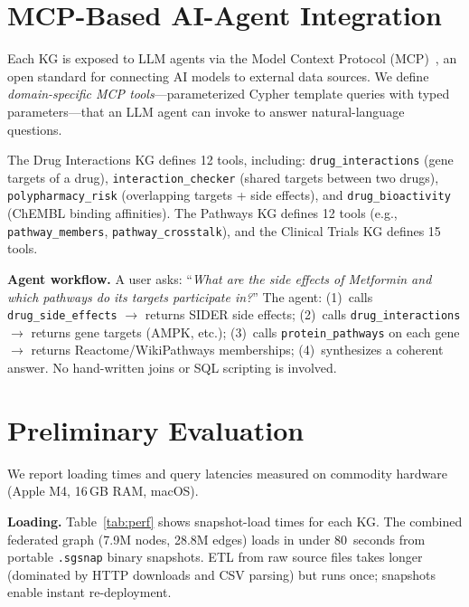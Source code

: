 \documentclass[sigconf]{acmart}
\begin{document}
\section{MCP-Based AI-Agent Integration}\label{sec:mcp}

Each KG is exposed to LLM agents via the Model Context
Protocol (MCP)~\cite{anthropic2024mcp}, an open standard for
connecting AI models to external data sources.  We define
\emph{domain-specific MCP tools}---parameterized Cypher template
queries with typed parameters---that an LLM agent can invoke
to answer natural-language questions.

The Drug Interactions KG defines 12 tools, including:
\texttt{drug\_interactions} (gene targets of a drug),
\texttt{interaction\_checker} (shared targets between two drugs),
\texttt{polypharmacy\_risk} (overlapping targets + side effects),
and \texttt{drug\_bioactivity} (ChEMBL binding affinities).
The Pathways KG defines 12 tools (e.g., \texttt{pathway\_members},
\texttt{pathway\_crosstalk}), and the Clinical Trials KG defines
15 tools.

\smallskip\noindent\textbf{Agent workflow.}  A user asks: ``\emph{What are
the side effects of Metformin and which pathways do its targets
participate in?}''  The agent: (1)~calls \texttt{drug\_side\_effects}
$\to$ returns SIDER side effects; (2)~calls
\texttt{drug\_interactions} $\to$ returns gene targets (AMPK, etc.);
(3)~calls \texttt{protein\_pathways} on each gene $\to$ returns
Reactome/WikiPathways memberships; (4)~synthesizes a coherent answer.
No hand-written joins or SQL scripting is involved.

\section{Preliminary Evaluation}\label{sec:eval}

We report loading times and query latencies measured on
commodity hardware (Apple M4, 16\,GB RAM, macOS).

\smallskip\noindent\textbf{Loading.}
Table~\ref{tab:perf} shows snapshot-load times for each KG.
The combined federated graph (7.9M nodes, 28.8M edges)
loads in under 80~seconds from portable \texttt{.sgsnap}
binary snapshots.  ETL from raw source files takes
longer (dominated by HTTP downloads and CSV parsing)
but runs once; snapshots enable instant re-deployment.
\end{document}
